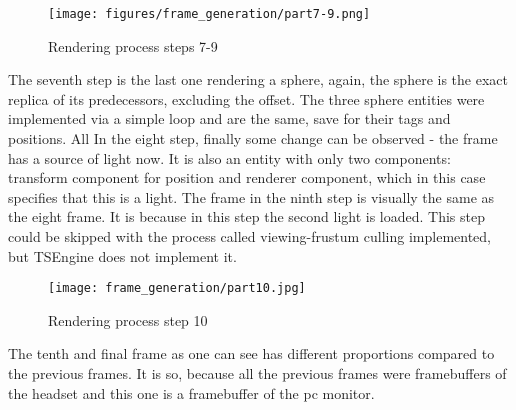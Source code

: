 \begin{figure}[H]
  \texttt{[image: figures/frame\_generation/part7-9.png]}
  \caption{Rendering process steps 7-9}
\end{figure}
The seventh step is the last one rendering a sphere, again, the sphere is the exact replica of its predecessors, excluding the offset. The three sphere entities were implemented via a simple loop and are the same, save for their tags and positions. All 
In the eight step, finally some change can be observed - the frame has a source of light now. It is also an entity with only two components: transform component for position and renderer component, which in this case specifies that this is a light.
The frame in the ninth step is visually the same as the eight frame. It is because in this step the second light is loaded. This step could be skipped with the process called viewing-frustum culling implemented, but TSEngine does not implement it. 
\begin{figure}[H]
  \texttt{[image: frame\_generation/part10.jpg]}
  \caption{Rendering process step 10}
\end{figure}
The tenth and final frame as one can see has different proportions compared to the previous frames. It is so, because all the previous frames were framebuffers of the headset and this one is a framebuffer of the pc monitor.

